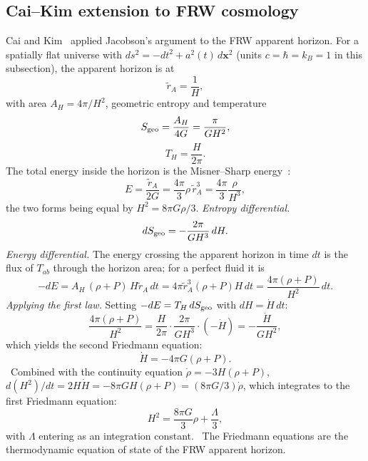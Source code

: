 \subsection{Cai--Kim extension to FRW cosmology}\label{sec:th:caikim}
Cai and Kim~\cite{CaiKim2005} applied Jacobson's argument to the FRW apparent horizon. For a spatially flat universe with $ds^2=-dt^2+a^2(t)\,d\mathbf x^2$ (units
$c=\hbar=k_B=1$ in this subsection), the apparent horizon is at
\begin{equation}\tilde r_A=\frac1H ,\label{eq:th:rA}\end{equation}
with area $A_H=4\pi/H^2$, geometric entropy and temperature~\cite{GibbonsHawking1977}
\begin{equation}S_{\rm geo}=\frac{A_H}{4G}=\frac{\pi}{GH^2},\label{eq:th:Sgeo}\end{equation}
\begin{equation}T_H=\frac{H}{2\pi}.\label{eq:th:TH}\end{equation}
The total energy inside the horizon is the Misner--Sharp energy~\cite{MisnerSharp1964}:
\begin{equation}E=\frac{\tilde r_A}{2G}=\frac{4\pi}{3}\rho\,\tilde r_A^3=\frac{4\pi}{3}\frac{\rho}{H^3},\label{eq:th:EMS}\end{equation}
the two forms being equal by $H^2=8\pi G\rho/3$.
\emph{Entropy differential.}
\begin{equation}dS_{\rm geo}=-\frac{2\pi}{GH^3}\,dH .\label{eq:th:dSgeo}\end{equation}
\emph{Energy differential.} The energy crossing the apparent horizon in time $dt$ is the flux of $T_{ab}$ through the horizon area; for a perfect fluid
it is
\begin{equation}-dE=A_H\,(\rho+P)\,H\tilde r_A\,dt=4\pi\tilde r_A^3(\rho+P)H\,dt=\frac{4\pi(\rho+P)}{H^2}\,dt .\label{eq:th:dE}\end{equation}
\emph{Applying the first law.} Setting $-dE=T_H\,dS_{\rm geo}$ with $dH=\dot H\,dt$:
\begin{equation}\frac{4\pi(\rho+P)}{H^2}=\frac{H}{2\pi}\cdot\frac{2\pi}{GH^3}\cdot(-\dot H)=-\frac{\dot H}{GH^2},\label{eq:th:firstlaw}\end{equation}
which yields the second Friedmann equation:
\begin{equation}\dot H=-4\pi G(\rho+P).\label{eq:th:Hdot}\end{equation}
\derived\ Combined with the continuity equation $\dot\rho=-3H(\rho+P)$, $d(H^2)/dt=2H\dot H=-8\pi GH(\rho+P)=(8\pi G/3)\dot\rho$, which integrates to the
first Friedmann equation:
\begin{equation}H^2=\frac{8\pi G}{3}\rho+\frac\Lambda3 ,\label{eq:th:friedmann}\end{equation}
with $\Lambda$ entering as an integration constant. \derived\ The Friedmann equations are the thermodynamic equation of state of the FRW apparent horizon.

